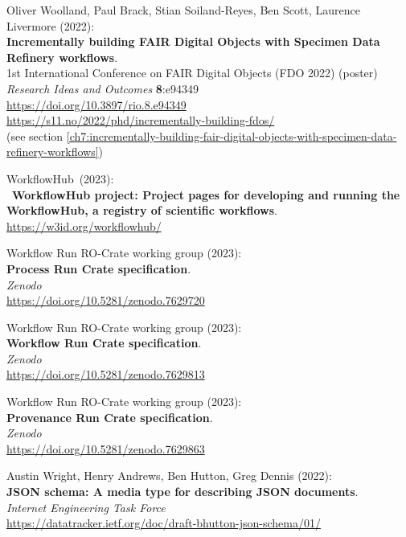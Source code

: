 \begin{thebibliography}{9}
Oliver Woolland, Paul Brack, Stian Soiland-Reyes, Ben Scott, Laurence
Livermore (2022):\\
\textbf{Incrementally building FAIR Digital Objects with Specimen Data
Refinery workflows}.\\
1st International Conference on FAIR Digital Objects
(FDO 2022) (poster)\\
\emph{Research Ideas and Outcomes} \textbf{8}:e94349\\
\url{https://doi.org/10.3897/rio.8.e94349}\\
\url{https://s11.no/2022/phd/incrementally-building-fdos/}\\
(see section \vref{ch7:incrementally-building-fair-digital-objects-with-specimen-data-refinery-workflows})

WorkflowHub~(2023):\\
~\textbf{WorkflowHub project: Project pages for developing and
running the WorkflowHub, a registry of scientific workflows}.\\
\url{https://w3id.org/workflowhub/}


Workflow Run RO-Crate working group (2023):\\
\textbf{Process Run Crate specification}.\\
\emph{Zenodo}\\
\url{https://doi.org/10.5281/zenodo.7629720}

Workflow Run RO-Crate working group (2023):\\
\textbf{Workflow Run Crate specification}.\\
\emph{Zenodo}\\
\url{https://doi.org/10.5281/zenodo.7629813}

Workflow Run RO-Crate
working group (2023):\\
\textbf{Provenance Run Crate specification}.\\
\emph{Zenodo}\\
\url{https://doi.org/10.5281/zenodo.7629863}


Austin Wright, Henry Andrews, Ben Hutton, Greg Dennis (2022):\\
\textbf{JSON schema: A media type for describing JSON documents}.\\
\emph{Internet Engineering Task Force}\\
\url{https://datatracker.ietf.org/doc/draft-bhutton-json-schema/01/}


\end{thebibliography}
